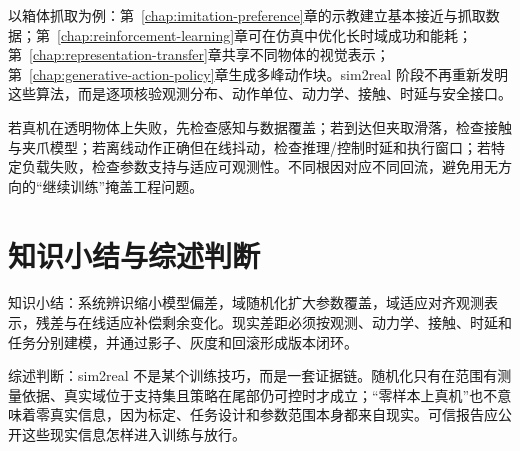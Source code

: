 以箱体抓取为例：第~\ref{chap:imitation-preference}章的示教建立基本接近与抓取数据；第~\ref{chap:reinforcement-learning}章可在仿真中优化长时域成功和能耗；第~\ref{chap:representation-transfer}章共享不同物体的视觉表示；第~\ref{chap:generative-action-policy}章生成多峰动作块。sim2real 阶段不再重新发明这些算法，而是逐项核验观测分布、动作单位、动力学、接触、时延与安全接口。

若真机在透明物体上失败，先检查感知与数据覆盖；若到达但夹取滑落，检查接触与夹爪模型；若离线动作正确但在线抖动，检查推理/控制时延和执行窗口；若特定负载失败，检查参数支持与适应可观测性。不同根因对应不同回流，避免用无方向的“继续训练”掩盖工程问题。

\section{知识小结与综述判断}

知识小结：系统辨识缩小模型偏差，域随机化扩大参数覆盖，域适应对齐观测表示，残差与在线适应补偿剩余变化。现实差距必须按观测、动力学、接触、时延和任务分别建模，并通过影子、灰度和回滚形成版本闭环。

综述判断：sim2real 不是某个训练技巧，而是一套证据链。随机化只有在范围有测量依据、真实域位于支持集且策略在尾部仍可控时才成立；“零样本上真机”也不意味着零真实信息，因为标定、任务设计和参数范围本身都来自现实。可信报告应公开这些现实信息怎样进入训练与放行。
